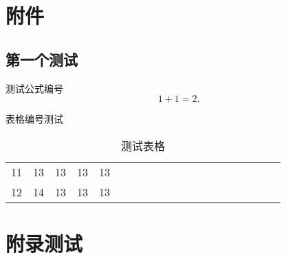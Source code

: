 \documentclass[forprint]{WHUBachelor}
\begin{document}

%
%





\appendix

\chapter{附件}

\section{第一个测试}
测试公式编号
\begin{equation}
1+1=2.
\end{equation}

表格编号测试

\begin{table}[h]
  \centering
  \caption{测试表格}
  \begin{tabular}{*{20}c}
     \hline
     11 & 13  & 13  & 13  & 13 \\
     12 & 14  & 13  & 13  & 13 \\
     \hline
   \end{tabular}
\end{table}


\chapter{附录测试}




\cleardoublepage
\end{document}
